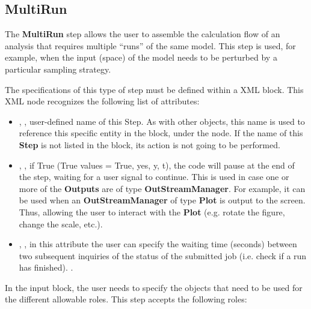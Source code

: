 \subsection{MultiRun}
\label{subsec:stepMultiRun}
The \textbf{MultiRun} step allows the user to assemble the calculation flow of
an analysis that requires multiple ``runs'' of the same model.
%
This step is used, for example, when the input (space) of the model needs to be
perturbed by a particular sampling strategy.
%

The specifications of this type of step must be defined within a
 XML block.
%
This XML node recognizes the following list of attributes:
\vspace{-5mm}
\begin{itemize}
\itemsep0em
\item {}, , user-defined name of
this Step. 
\nb As with other objects, this name is used to reference this specific entity
in the  block, under the  node. If the name 
of this \textbf{Step} is not listed in the   block, its action is not
going to be performed.
\item {}, , if True
(True values = True, yes, y, t), the code will pause at the end of
the step, waiting for a user signal to continue. This is used in case one or
more of the \textbf{Outputs} are of type \textbf{OutStreamManager}.
For example, it can be used when an \textbf{OutStreamManager} of type
\textbf{Plot} is output to the screen. Thus, allowing the user to interact with
the \textbf{Plot} (e.g. rotate the figure, change the scale, etc.).
\item {}, , in this attribute
the user can specify the waiting time (seconds) between two subsequent inquiries
of the status of the submitted job (i.e. check if a run has finished).
.
\end{itemize}
\vspace{-5mm}
In the  input block, the user needs to specify the objects
that need to be used for the different allowable roles.
%
This step accepts the following roles:
\vspace{-5mm}
